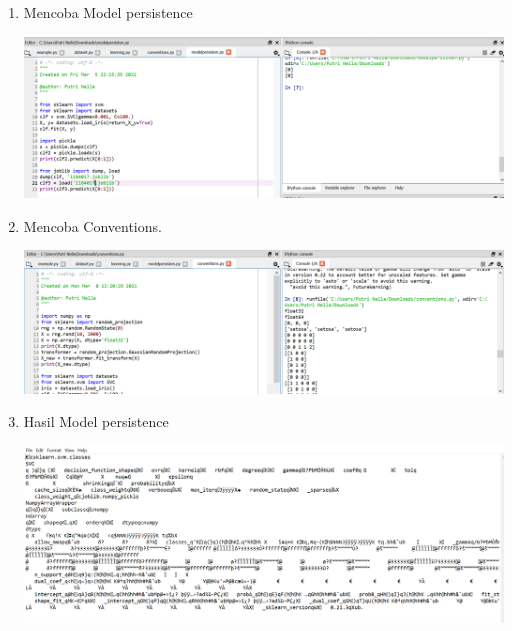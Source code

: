 \begin{enumerate}
\begin{center}
    \end{center}
    \item Mencoba Model persistence
    \begin{center}
    \includegraphics[width=.8\textwidth]{figures/1184017/chapter1/5.PNG}
    \end{center}
    \item Mencoba Conventions.
     \begin{center}
    \includegraphics[width=.8\textwidth]{figures/1184017/chapter1/6.PNG}
    \end{center}
    \item Hasil Model persistence
     \begin{center}
    \includegraphics[width=.8\textwidth]{figures/1184017/chapter1/7.PNG}
    \end{center}
\end{enumerate}

